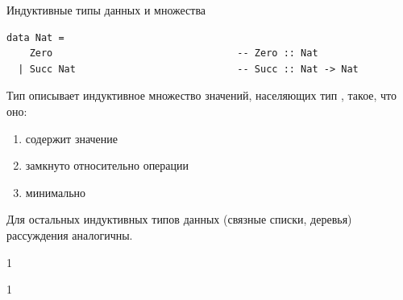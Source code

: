 \documentclass[aspectratio=169
  , xcolor={svgnames}
  , hyperref={ colorlinks,citecolor=DeepPink4
             , linkcolor=DarkRed,urlcolor=DarkBlue}
  , russian
  ]{beamer}
\theoremstyle{exerciseStyle1}
\begin{document}
\begin{frame}[fragile]{Индуктивные типы данных и множества}
\begin{verbatim}
data Nat = 
    Zero                                -- Zero :: Nat
  | Succ Nat                            -- Succ :: Nat -> Nat
\end{verbatim}
Тип  описывает индуктивное множество значений, населяющих тип , такое, что оно:
\begin{enumerate}
  \item содержит значение   
  \item замкнуто относительно операции 
  \item минимально
\end{enumerate}

Для остальных индуктивных типов данных (связные списки, деревья) рассуждения аналогичны.
\end{frame}








\begin{frame}[fragile]{}
1
\end{frame}


\begin{frame}[fragile]{}
1
\end{frame}

\end{document}
